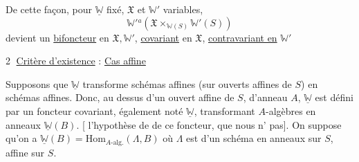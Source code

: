 De cette façon, pour $\underline{\mathbb W}$ fixé,   $\mathfrak X$ et $\mathbb W'$ variables,
\[
 \mathbb W'{}^a(\mathfrak X\times_{\mathbb W(S)}\mathbb W'(S))
\]
devient un \uline{bifoncteur} en $\mathfrak X,\mathbb W'$, \uline{covariant} en $\mathfrak X$, \uline{contravariant en} $\mathbb W'$

\textcircled{2} \uline{Critère d'existence} : \uline{Cas affine}


Supposons que $\underline{\mathbb W}$ transforme schémas affines (sur ouverts affines de $S$) en schémas affines. Donc, au dessus d'un ouvert affine de $S$, d'anneau $A$, $\underline{\mathbb W}$ est défini par un foncteur covariant, également noté $\underline{\mathbb W}$, transformant $A$-algèbres  en anneaux $\underline{\mathbb W}(B)$. [ l'hypothèse de   de ce foncteur, que nous n' pas]. On suppose qu'on a $\underline{\mathbb W}(B)=\mathrm{Hom}_{A\text{-alg.}}(\Lambda,B)$ où $\Lambda$ est   d'un schéma en anneaux  sur $S$, affine sur $S$.
